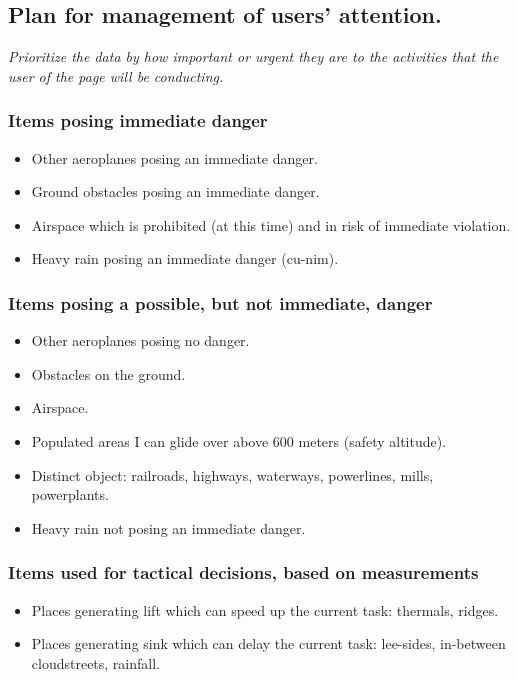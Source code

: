 \documentclass{article}
\newcommand{\myquote}[1]
{
	\textit{#1}
}
\begin{document}
\subsection{Plan for management of users' attention.}
\myquote{Prioritize the data by how important or urgent they are to the activities that the user of the page will be conducting.}

\subsubsection{Items posing immediate danger}
\begin{itemize}
\item Other aeroplanes posing an immediate danger.
\item Ground obstacles posing an immediate danger.
\item Airspace which is prohibited (at this time) and in risk of immediate violation.
\item Heavy rain posing an immediate danger (cu-nim).
\end{itemize}

\subsubsection{Items posing a possible, but not immediate, danger}
\begin{itemize}
\item Other aeroplanes posing no danger.
\item Obstacles on the ground.
\item Airspace.
\item Populated areas I can glide over above 600 meters (safety altitude).
\item Distinct object: railroads, highways, waterways, powerlines, mills, powerplants.
\item Heavy rain not posing an immediate danger.
\end{itemize}

\subsubsection{Items used for tactical decisions, based on measurements}
\begin{itemize}
\item Places generating lift which can speed up the current task: thermals, ridges.
\item Places generating sink which can delay the current task: lee-sides, in-between cloudstreets, rainfall.
\end{itemize}
\end{document}
